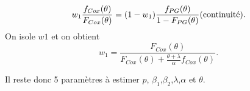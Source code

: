 	$$
	w_1 \frac{f_{Cox}(\theta)}{F_{Cox}(\theta)} = (1-w_1) \frac{f_{PG}(\theta)}{1-F_{PG}(\theta)}  (\textrm{continuité}). \\
	$$
	On isole $w1$ et on obtient
	$$
	w_1 = \frac{F_{Cox}(\theta)}{F_{Cox}(\theta)+ \frac{\theta+\lambda}{\alpha}  f_{Cox}(\theta)}.
	$$
	
	Il reste donc 5 paramètres à estimer $p$, $\beta_1$,$\beta_2$,$\lambda$,$\alpha$ et $\theta$.
